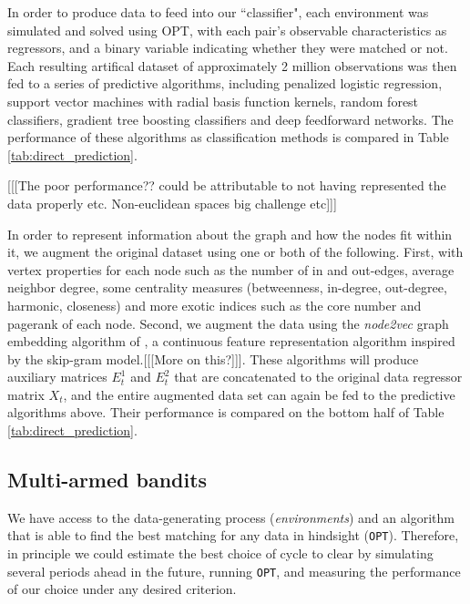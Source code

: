 \documentclass[12pt]{article}
\begin{document}
In order to produce data to feed into our ``classifier", each environment was simulated and solved using OPT, with each pair's observable characteristics as regressors, and a binary variable indicating whether they were matched or not. Each resulting artifical dataset of approximately 2 million observations was then fed to a series of predictive algorithms, including penalized logistic regression\cite{wu2009genome}, support vector machines with radial basis function kernels\cite{cortes1995support}, random forest classifiers\cite{breiman2001random}, gradient tree boosting classifiers\cite{friedman2001greedy} and deep feedforward networks\cite{goodfellow2016deep}. The performance of these algorithms as classification methods is compared in Table \ref{tab:direct_prediction}.

[[[The poor performance?? could be attributable to not having represented the data properly etc. Non-euclidean spaces big challenge etc]]]

 In order to represent information about the graph and how the nodes fit within it, we augment the original dataset using one or both of the following. First, with vertex properties for each node such as the number of in and out-edges, average neighbor degree, some centrality measures (betweenness, in-degree, out-degree, harmonic, closeness) and more exotic indices such as the core number and pagerank of each node\cite{newman2010networks}. Second, we augment the data using the \emph{node2vec} graph embedding algorithm of \cite{grover2016node2vec}, a continuous feature representation algorithm inspired by the skip-gram model.[[[More on this?]]]. These algorithms will produce auxiliary matrices $E_t^{1}$ and $E_t^2$ that are concatenated to the original data regressor matrix $X_t$, and the entire augmented data set can again be fed to the predictive algorithms above. Their performance is compared on the bottom half of Table \ref{tab:direct_prediction}.
 

 
 
\subsection{Multi-armed bandits}
 
We have access to the data-generating process (\emph{environments}) and an algorithm that is able to find the best matching for any data in hindsight (\texttt{OPT}). Therefore, in principle we could estimate the best choice of cycle to clear by simulating several periods ahead in the future, running \texttt{OPT}, and measuring the performance of our choice under any desired criterion. 
\end{document}
